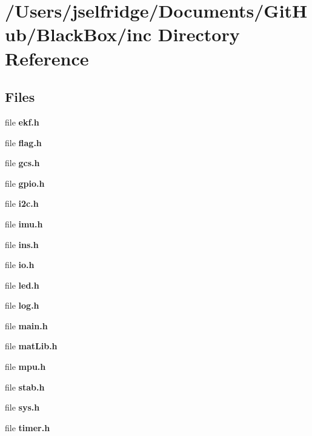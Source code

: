 \section{/\+Users/jselfridge/\+Documents/\+Git\+Hub/\+Black\+Box/inc Directory Reference}
\label{dir_bfccd401955b95cf8c75461437045ac0}
\subsection*{Files}
\begin{DoxyCompactItemize}
\item 
file \textbf{ ekf.\+h}
\item 
file \textbf{ flag.\+h}
\item 
file \textbf{ gcs.\+h}
\item 
file \textbf{ gpio.\+h}
\item 
file \textbf{ i2c.\+h}
\item 
file \textbf{ imu.\+h}
\item 
file \textbf{ ins.\+h}
\item 
file \textbf{ io.\+h}
\item 
file \textbf{ led.\+h}
\item 
file \textbf{ log.\+h}
\item 
file \textbf{ main.\+h}
\item 
file \textbf{ mat\+Lib.\+h}
\item 
file \textbf{ mpu.\+h}
\item 
file \textbf{ stab.\+h}
\item 
file \textbf{ sys.\+h}
\item 
file \textbf{ timer.\+h}
\end{DoxyCompactItemize}
